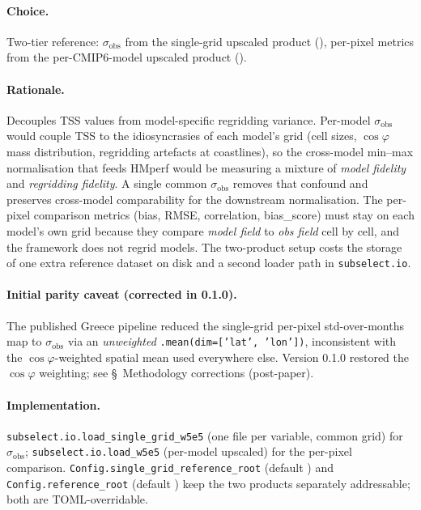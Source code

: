 \documentclass[11pt,a4paper]{article}
\begin{document}
\paragraph{Choice.} Two-tier reference: $\sigma_{\text{obs}}$ from the
single-grid upscaled product
(),
per-pixel metrics from the per-CMIP6-model upscaled product
().

\paragraph{Rationale.} Decouples TSS values from model-specific regridding
variance. Per-model $\sigma_{\text{obs}}$ would couple TSS to the
idiosyncrasies of each model's grid (cell sizes, $\cos\varphi$ mass
distribution, regridding artefacts at coastlines), so the cross-model
min--max normalisation that feeds HMperf would be measuring a mixture of
\emph{model fidelity} and \emph{regridding fidelity}. A single common
$\sigma_{\text{obs}}$ removes that confound and preserves cross-model
comparability for the downstream normalisation. The per-pixel comparison
metrics (bias, RMSE, correlation, bias\_score) must stay on each model's
own grid because they compare \emph{model field} to \emph{obs field} cell
by cell, and the framework does not regrid models. The two-product setup
costs the storage of one extra reference dataset on disk and a second
loader path in \texttt{subselect.io}.

\paragraph{Initial parity caveat (corrected in 0.1.0).} The published
Greece pipeline reduced the single-grid per-pixel std-over-months map
to $\sigma_{\text{obs}}$ via an \emph{unweighted}
\texttt{.mean(dim=['lat', 'lon'])}, inconsistent with the
$\cos\varphi$-weighted spatial mean used everywhere else. Version 0.1.0
restored the $\cos\varphi$ weighting; see \S\ Methodology corrections
(post-paper).

\paragraph{Implementation.}
\texttt{subselect.io.load\_single\_grid\_w5e5} (one file per variable,
common grid) for $\sigma_{\text{obs}}$;
\texttt{subselect.io.load\_w5e5} (per-model upscaled) for the per-pixel
comparison. \texttt{Config.single\_grid\_reference\_root} (default
) and
\texttt{Config.reference\_root} (default
) keep the two
products separately addressable; both are TOML-overridable.
\end{document}
